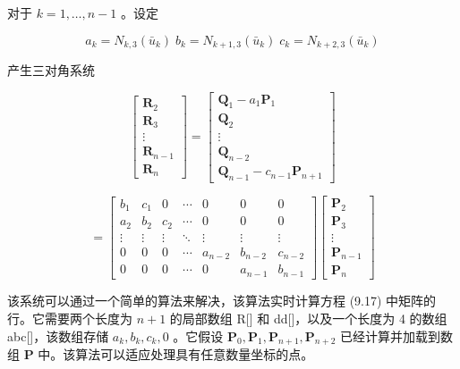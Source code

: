 \documentclass[../main.tex]{subfiles}
\begin{document}
对于 \(k = 1,\ldots ,n - 1\) 。设定

\[
{a}_{k} = {N}_{k,3}\left( {\bar{u}}_{k}\right) \;{b}_{k} = {N}_{k + 1,3}\left( {\bar{u}}_{k}\right) \;{c}_{k} = {N}_{k + 2,3}\left( {\bar{u}}_{k}\right)
\]

产生三对角系统

\[
\left\lbrack  \begin{matrix} {\mathbf{R}}_{2} \\  {\mathbf{R}}_{3} \\  \vdots \\  {\mathbf{R}}_{n - 1} \\  {\mathbf{R}}_{n} \end{matrix}\right\rbrack   = \left\lbrack  \begin{matrix} {\mathbf{Q}}_{1} - {a}_{1}{\mathbf{P}}_{1} \\  {\mathbf{Q}}_{2} \\  \vdots \\  {\mathbf{Q}}_{n - 2} \\  {\mathbf{Q}}_{n - 1} - {c}_{n - 1}{\mathbf{P}}_{n + 1} \end{matrix}\right\rbrack
\]

\[
= \left\lbrack  \begin{matrix} {b}_{1} & {c}_{1} & 0 & \cdots & 0 & 0 & 0 \\  {a}_{2} & {b}_{2} & {c}_{2} & \cdots & 0 & 0 & 0 \\  \vdots & \vdots & \vdots &  \ddots  & \vdots & \vdots & \vdots \\  0 & 0 & 0 & \cdots & {a}_{n - 2} & {b}_{n - 2} & {c}_{n - 2} \\  0 & 0 & 0 & \cdots & 0 & {a}_{n - 1} & {b}_{n - 1} \end{matrix}\right\rbrack  \left\lbrack  \begin{matrix} {\mathbf{P}}_{2} \\  {\mathbf{P}}_{3} \\  \vdots \\  {\mathbf{P}}_{n - 1} \\  {\mathbf{P}}_{n} \end{matrix}\right\rbrack   \tag{9.17}
\]

该系统可以通过一个简单的算法来解决，该算法实时计算方程 (9.17) 中矩阵的行。它需要两个长度为 \(n + 1\) 的局部数组 R[] 和 dd[]，以及一个长度为 4 的数组 abc[]，该数组存储 \({a}_{k},{b}_{k},{c}_{k},0\) 。它假设 \({\mathbf{P}}_{0},{\mathbf{P}}_{1},{\mathbf{P}}_{n + 1},{\mathbf{P}}_{n + 2}\) 已经计算并加载到数组 \(\mathbf{P}\) 中。该算法可以适应处理具有任意数量坐标的点。
\end{document}
